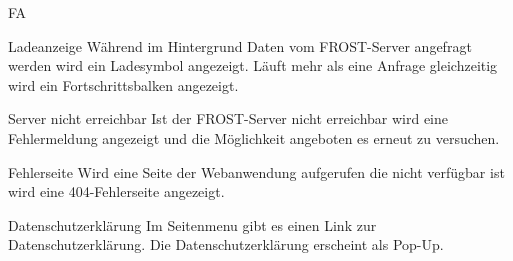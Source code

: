 \begin{Kriterien}{FA}
 \item[Ladeanzeige]
  Während im Hintergrund Daten vom \gls{FROST-Server} angefragt werden wird ein Ladesymbol angezeigt.
  Läuft mehr als eine Anfrage gleichzeitig wird ein Fortschrittsbalken angezeigt.

 \item[Server nicht erreichbar]
  Ist der \gls{FROST-Server} nicht erreichbar wird eine Fehlermeldung angezeigt und die Möglichkeit angeboten es erneut zu versuchen.

 \item[Fehlerseite]
  Wird eine Seite der \gls{Webanwendung} aufgerufen die nicht verfügbar ist wird eine 404-Fehlerseite angezeigt.

 \item[Datenschutzerklärung]
  Im \gls{Seitenmenu} gibt es einen Link zur Datenschutzerklärung.
  Die Datenschutzerklärung erscheint als \gls{Pop-Up}.
\end{Kriterien}